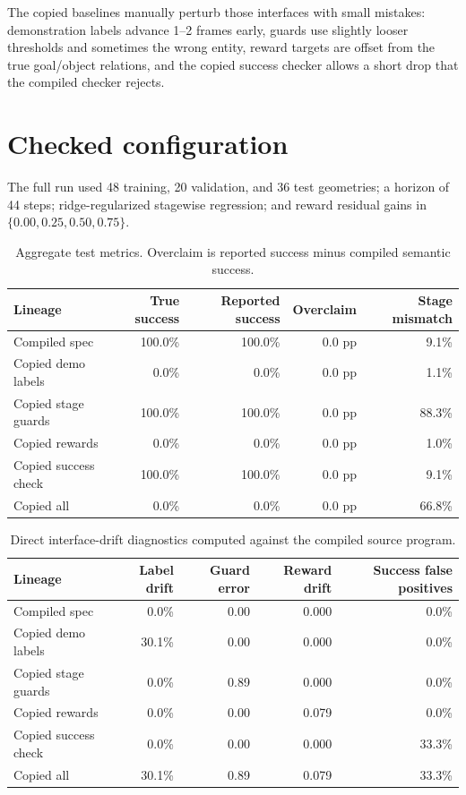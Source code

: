 \documentclass[11pt]{article}
\begin{document}
The copied baselines manually perturb those interfaces with small mistakes: demonstration labels advance 1--2 frames early, guards use slightly looser thresholds and sometimes the wrong entity, reward targets are offset from the true goal/object relations, and the copied success checker allows a short drop that the compiled checker rejects.

\section{Checked configuration}
The full run used 48 training, 20 validation, and 36 test geometries; a horizon of 44 steps; ridge-regularized stagewise regression; and reward residual gains in $\{0.00, 0.25, 0.50, 0.75\}$.

\begin{table}[H]
\centering
\begin{tabular}{lrrrr}
\toprule
Lineage & True success & Reported success & Overclaim & Stage mismatch \\
\midrule
Compiled spec & 100.0\% & 100.0\% & 0.0 pp & 9.1\% \\
Copied demo labels & 0.0\% & 0.0\% & 0.0 pp & 1.1\% \\
Copied stage guards & 100.0\% & 100.0\% & 0.0 pp & 88.3\% \\
Copied rewards & 0.0\% & 0.0\% & 0.0 pp & 1.0\% \\
Copied success check & 100.0\% & 100.0\% & 0.0 pp & 9.1\% \\
Copied all & 0.0\% & 0.0\% & 0.0 pp & 66.8\% \\
\bottomrule
\end{tabular}
\caption{Aggregate test metrics. Overclaim is reported success minus compiled semantic success.}
\end{table}

\begin{table}[H]
\centering
\begin{tabular}{lrrrr}
\toprule
Lineage & Label drift & Guard error & Reward drift & Success false positives \\
\midrule
Compiled spec & 0.0\% & 0.00 & 0.000 & 0.0\% \\
Copied demo labels & 30.1\% & 0.00 & 0.000 & 0.0\% \\
Copied stage guards & 0.0\% & 0.89 & 0.000 & 0.0\% \\
Copied rewards & 0.0\% & 0.00 & 0.079 & 0.0\% \\
Copied success check & 0.0\% & 0.00 & 0.000 & 33.3\% \\
Copied all & 30.1\% & 0.89 & 0.079 & 33.3\% \\
\bottomrule
\end{tabular}
\caption{Direct interface-drift diagnostics computed against the compiled source program.}
\end{table}
\end{document}
